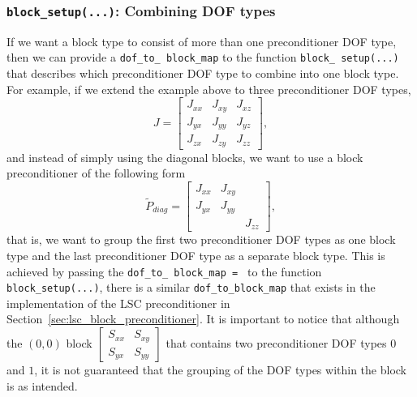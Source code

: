 \subsubsection{\texttt{block\_setup(...)}: Combining DOF types\label{sec:block_setup_combining_dof_types}}
If we want a block type to consist of more than one preconditioner DOF type,
then we can provide a \texttt{dof\_\allowbreak to\_\allowbreak
  block\_\allowbreak map} to the function \texttt{block\_\allowbreak
  setup(...)} that describes which preconditioner DOF type to combine into one block type. For example, if we extend the
example above to three preconditioner DOF types,
\begin{equation*}
J =
\begin{bmatrix}
J_{xx}&J_{xy}&J_{xz} \\
J_{yx}&J_{yy}&J_{yz} \\
J_{zx}&J_{zy}&J_{zz}
\end{bmatrix},
\end{equation*}
and instead of simply using the diagonal blocks, we want to use a block
preconditioner of the following form
\begin{equation*}
\tilde{P}_{diag} =
\begin{bmatrix}
J_{xx}&J_{xy}&       \\
J_{yx}&J_{yy}&       \\
      &      &J_{zz}
\end{bmatrix},
\end{equation*}
that is, we want to group the first two preconditioner DOF types as one block
type and the last preconditioner DOF type as a separate block type. This is
achieved by passing the \texttt{dof\_\allowbreak to\_\allowbreak
  block\_\allowbreak map \allowbreak = \allowbreak [0 0 1]} to the function
\texttt{block\_\allowbreak setup(...)}, there is a similar
\texttt{dof\_\allowbreak to\_\allowbreak block\_\allowbreak map} that exists in
the implementation of the LSC preconditioner in
Section~\ref{sec:lsc_block_preconditioner}. It is important to notice that
although the $(0,0)$ block 
$\displaystyle
\begin{bmatrix}
S_{xx}&S_{xy} \\
S_{yx}&S_{yy} 
\end{bmatrix}
$
that contains two preconditioner DOF types $0$ and $1$, it is not guaranteed
that the grouping of the DOF types within the block is as intended.
